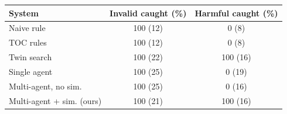\begin{tabular}{lcc}
\toprule
System & Invalid caught (\%) & Harmful caught (\%) \\
\midrule
Naive rule & 100 (12) & 0 (8) \\
TOC rules & 100 (12) & 0 (8) \\
Twin search & 100 (22) & 100 (16) \\
Single agent & 100 (25) & 0 (19) \\
Multi-agent, no sim. & 100 (25) & 0 (16) \\
Multi-agent + sim. (ours) & 100 (21) & 100 (16) \\
\bottomrule
\end{tabular}
